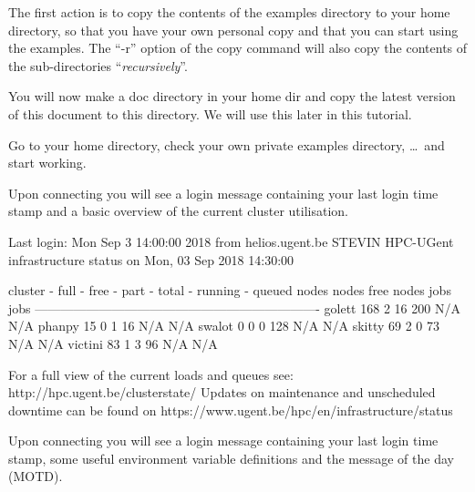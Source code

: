 The first action is to copy the contents of the \hpc examples directory
to your home directory, so that you have your own personal copy and that
you can start using the examples. The ``-r'' option of the copy command
will also copy the contents of the sub-directories ``\emph{recursively}''.

\begin{prompt}
\end{prompt}

\ifgent
You will now make a doc directory in your home dir and copy the latest version of this document to this directory. We will use this later in this tutorial.

\begin{prompt}
\end{prompt}

Go to your home directory, check your own private examples directory, \dots\
and start working.

\begin{prompt}
\end{prompt}

Upon connecting you will see a login message containing your last login
time stamp and a basic overview of the current cluster utilisation.

\begin{prompt}
Last login: Mon Sep  3 14:00:00 2018 from helios.ugent.be
STEVIN HPC-UGent infrastructure status on Mon, 03 Sep 2018 14:30:00

   cluster - full - free -  part - total - running - queued
             nodes  nodes   free   nodes    jobs      jobs
-------------------------------------------------------------------
    golett    168      2     16     200      N/A       N/A
    phanpy     15      0      1      16      N/A       N/A
    swalot      0      0      0     128      N/A       N/A
    skitty     69      2      0      73      N/A       N/A
   victini     83      1      3      96      N/A       N/A

For a full view of the current loads and queues see:
 http://hpc.ugent.be/clusterstate/
Updates on maintenance and unscheduled downtime can be found on
 https://www.ugent.be/hpc/en/infrastructure/status

\end{prompt}
\fi %
%
\ifbrussel
Upon connecting you will see a login message containing your last login
time stamp, some useful environment variable definitions and the message of the
day (MOTD).


